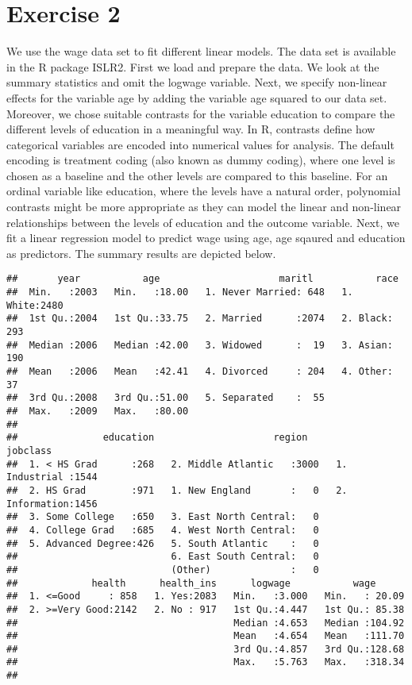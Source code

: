 \documentclass[
]{article}
\begin{document}
\hypertarget{exercise-2}{%
\section{Exercise 2}\label{exercise-2}}

We use the wage data set to fit different linear models. The data set is
available in the R package ISLR2. First we load and prepare the data. We
look at the summary statistics and omit the logwage variable. Next, we
specify non-linear effects for the variable age by adding the variable
age squared to our data set. Moreover, we chose suitable contrasts for
the variable education to compare the different levels of education in a
meaningful way. In R, contrasts define how categorical variables are
encoded into numerical values for analysis. The default encoding is
treatment coding (also known as dummy coding), where one level is chosen
as a baseline and the other levels are compared to this baseline. For an
ordinal variable like education, where the levels have a natural order,
polynomial contrasts might be more appropriate as they can model the
linear and non-linear relationships between the levels of education and
the outcome variable. Next, we fit a linear regression model to predict
wage using age, age sqaured and education as predictors. The summary
results are depicted below.

\begin{verbatim}
##       year           age                     maritl           race     
##  Min.   :2003   Min.   :18.00   1. Never Married: 648   1. White:2480  
##  1st Qu.:2004   1st Qu.:33.75   2. Married      :2074   2. Black: 293  
##  Median :2006   Median :42.00   3. Widowed      :  19   3. Asian: 190  
##  Mean   :2006   Mean   :42.41   4. Divorced     : 204   4. Other:  37  
##  3rd Qu.:2008   3rd Qu.:51.00   5. Separated    :  55                  
##  Max.   :2009   Max.   :80.00                                          
##                                                                        
##               education                     region               jobclass   
##  1. < HS Grad      :268   2. Middle Atlantic   :3000   1. Industrial :1544  
##  2. HS Grad        :971   1. New England       :   0   2. Information:1456  
##  3. Some College   :650   3. East North Central:   0                        
##  4. College Grad   :685   4. West North Central:   0                        
##  5. Advanced Degree:426   5. South Atlantic    :   0                        
##                           6. East South Central:   0                        
##                           (Other)              :   0                        
##             health      health_ins      logwage           wage       
##  1. <=Good     : 858   1. Yes:2083   Min.   :3.000   Min.   : 20.09  
##  2. >=Very Good:2142   2. No : 917   1st Qu.:4.447   1st Qu.: 85.38  
##                                      Median :4.653   Median :104.92  
##                                      Mean   :4.654   Mean   :111.70  
##                                      3rd Qu.:4.857   3rd Qu.:128.68  
##                                      Max.   :5.763   Max.   :318.34  
## 
\end{verbatim}
\end{document}
